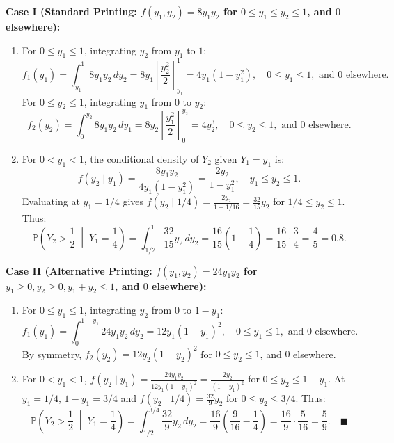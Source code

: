 \documentclass[11pt, letterpaper]{article}
\theoremstyle{definition}
\theoremstyle{remark}
\newcommand{\Prob}{\mathbb{P}}
\begin{document}
\textbf{Case I (Standard Printing: $f(y_1, y_2) = 8y_1 y_2$ for $0 \le y_1 \le y_2 \le 1$, and $0$ elsewhere):}
\begin{enumerate}[label=\textbf{\alph*}]
    \item For $0 \le y_1 \le 1$, integrating $y_2$ from $y_1$ to $1$:
    \[ f_1(y_1) = \int_{y_1}^1 8y_1 y_2 \, dy_2 = 8y_1 \left[ \frac{y_2^2}{2} \right]_{y_1}^1 = 4y_1(1 - y_1^2), \quad 0 \le y_1 \le 1, \text{ and } 0 \text{ elsewhere.} \]
    For $0 \le y_2 \le 1$, integrating $y_1$ from $0$ to $y_2$:
    \[ f_2(y_2) = \int_0^{y_2} 8y_1 y_2 \, dy_1 = 8y_2 \left[ \frac{y_1^2}{2} \right]_0^{y_2} = 4y_2^3, \quad 0 \le y_2 \le 1, \text{ and } 0 \text{ elsewhere.} \]
    \item For $0 < y_1 < 1$, the conditional density of $Y_2$ given $Y_1 = y_1$ is:
    \[ f(y_2 \mid y_1) = \frac{8y_1 y_2}{4y_1(1 - y_1^2)} = \frac{2y_2}{1 - y_1^2}, \quad y_1 \le y_2 \le 1. \]
    Evaluating at $y_1 = 1/4$ gives $f(y_2 \mid 1/4) = \frac{2y_2}{1 - 1/16} = \frac{32}{15}y_2$ for $1/4 \le y_2 \le 1$. Thus:
    \[ \Prob\left(Y_2 > \frac{1}{2} \;\middle|\; Y_1 = \frac{1}{4}\right) = \int_{1/2}^1 \frac{32}{15}y_2 \, dy_2 = \frac{16}{15}\left(1 - \frac{1}{4}\right) = \frac{16}{15} \cdot \frac{3}{4} = \frac{4}{5} = 0.8. \]
\end{enumerate}

\textbf{Case II (Alternative Printing: $f(y_1, y_2) = 24y_1 y_2$ for $y_1 \ge 0, y_2 \ge 0, y_1 + y_2 \le 1$, and $0$ elsewhere):}
\begin{enumerate}[label=\textbf{\alph*}]
    \item For $0 \le y_1 \le 1$, integrating $y_2$ from $0$ to $1 - y_1$:
    \[ f_1(y_1) = \int_0^{1 - y_1} 24y_1 y_2 \, dy_2 = 12y_1(1 - y_1)^2, \quad 0 \le y_1 \le 1, \text{ and } 0 \text{ elsewhere.} \]
    By symmetry, $f_2(y_2) = 12y_2(1 - y_2)^2$ for $0 \le y_2 \le 1$, and $0$ elsewhere.
    \item For $0 < y_1 < 1$, $f(y_2 \mid y_1) = \frac{24y_1 y_2}{12y_1(1 - y_1)^2} = \frac{2y_2}{(1 - y_1)^2}$ for $0 \le y_2 \le 1 - y_1$. At $y_1 = 1/4$, $1 - y_1 = 3/4$ and $f(y_2 \mid 1/4) = \frac{32}{9}y_2$ for $0 \le y_2 \le 3/4$. Thus:
    \[ \Prob\left(Y_2 > \frac{1}{2} \;\middle|\; Y_1 = \frac{1}{4}\right) = \int_{1/2}^{3/4} \frac{32}{9}y_2 \, dy_2 = \frac{16}{9}\left(\frac{9}{16} - \frac{1}{4}\right) = \frac{16}{9} \cdot \frac{5}{16} = \frac{5}{9}. \quad \blacksquare \]
\end{enumerate}

\end{document}
